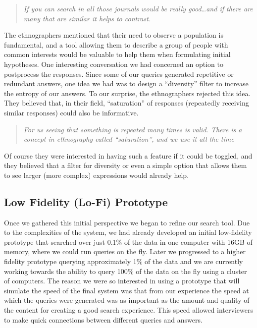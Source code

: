 \documentclass{sigchi}
\begin{document}
\begin{quote}
{\em
If you can search in all those journals would be really good\dots and if there are many that are similar it helps to contrast. 
}\end{quote}

The ethnographers mentioned that their need to observe a population is fundamental, and a tool allowing them to describe a group of people with common interests would be valuable to help them when formulating initial hypotheses. One interesting conversation we had concerned an option to postprocess the responses. Since some of our queries generated repetitive or redundant answers, one idea we had was to design a ``diversity'' filter to increase the entropy of our answers. To our surprise, the ethnographers rejected this idea. They believed that, in their field, ``saturation'' of responses (repeatedly receiving similar responses) could also be informative.

\begin{quote}
{\em
For us seeing that something is repeated many times is valid. There is a concept in ethnography called ``saturation'', and we use it all the time
}\end{quote}

Of course they were interested in having such a feature if it could be toggled, and they believed that a filter for diversity or even a simple option that allows them to see larger (more complex) expressions would already help.

\subsection{Low Fidelity (Lo-Fi) Prototype}
Once we gathered this initial perspective we began to refine our search tool. Due to the complexities of the system, we had already developed an initial low-fidelity prototype that searched over just 0.1\% of the data in one computer with 16GB of memory, where we could run queries on the fly. Later we progressed to a higher fidelity prototype querying approximately 1\% of the data and we are currently working towards the ability to query 100\% of the data on the fly using a cluster of computers. The reason we were so interested in using a prototype that will simulate the speed of the final system was that from our experience the speed at which the queries were generated was as important as the amount and quality of the content for creating a good search experience. This speed allowed interviewers to make quick connections between different queries and answers.
\end{document}
